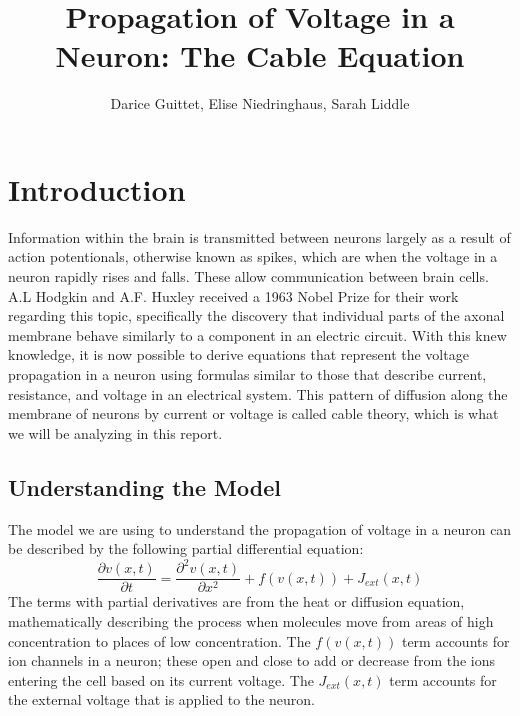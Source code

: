 \documentclass[12pt]{article}
\title{Propagation of Voltage in a Neuron: The Cable Equation}
\author{Darice Guittet, Elise Niedringhaus, Sarah Liddle}
\begin{document}
\maketitle
\section{Introduction}

Information within the brain is transmitted between neurons largely as a result of action potentionals, otherwise known as spikes, which are when the voltage in a neuron rapidly rises and falls. These allow communication between brain cells. A.L Hodgkin and A.F. Huxley received a 1963 Nobel Prize for their work regarding this topic, specifically the discovery that individual parts of the axonal membrane behave similarly to a component in an electric circuit. With this knew knowledge, it is now possible to derive equations that represent the voltage propagation in a neuron using formulas similar to those that describe current, resistance, and voltage in an electrical system. This pattern of diffusion along the membrane of neurons by current or voltage is called cable theory, which is what we will be analyzing in this report.

\subsection{Understanding the Model}
The model we are using to understand the propagation of voltage in a neuron can be described by the following partial differential equation:
\begin{equation} \label{1}
\frac{\partial{v(x,t)}}{\partial{t}}=\frac{\partial^2{v(x,t)}}{\partial{x}^2}+f(v(x,t))+J_{ext}(x,t)
\end {equation}
The terms with partial derivatives are from the heat or diffusion equation, mathematically describing the process when molecules move from areas of high concentration to places of low concentration. The $f(v(x,t))$ term accounts for ion channels in a neuron; these open and close to add or decrease from the ions entering the cell based on its current voltage. The $J_{ext}(x,t)$ term accounts for the external voltage that is applied to the neuron. 
\end{document}
